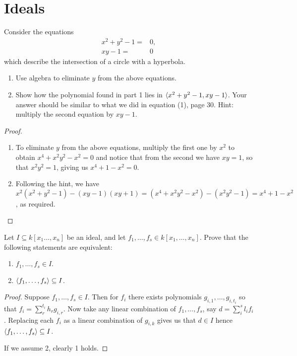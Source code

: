 \section{Ideals}


\begin{exercise}{1}
Consider the equations
\begin{align*}
    x^2+y^2-1 =& 0,\\
    xy-1 =& 0
\end{align*}
which describe the intersection of a circle with a hyperbola.
\begin{enumerate}
    \item Use algebra to eliminate $y$ from the above equations.
    \item Show how the polynomial found in part 1 lies in $\langle x^2+y^2-1, xy-1\rangle$. 
    Your answer should be similar to what we did in equation (1), page 30. 
    Hint: multiply the second equation by $xy-1$.
\end{enumerate}
\end{exercise}
\begin{proof}
\begin{enumerate}
    \item To eliminate $y$ from the above equations, multiply the first one by $x^2$ to obtain $x^4+x^2y^2-x^2=0$ and notice that from the second we have $xy=1$, so that $x^2y^2=1$, giving us $x^4+1-x^2=0$.
    \item Following the hint, we have 
    $x^2(x^2+y^2-1)-(xy-1)(xy+1) 
    =(x^4+x^2y^2-x^2)-(x^2y^2-1) 
    =x^4+1-x^2$, as required.
\end{enumerate}
\end{proof}

\begin{exercise}{2}
Let $I\subseteq k[x_1\dots,x_n]$ be an ideal, and let $f_1,\dots,f_s\in k[x_1,\dots,x_n]$. 
Prove that the following statements are equivalent:
\begin{enumerate}
    \item $f_1,\dots,f_s\in I$.
    \item $\langle f_1,\dots,f_s\rangle\subseteq I$.
\end{enumerate}
\end{exercise}
\begin{proof}
Suppose $f_1,\dots,f_s\in I$. 
Then for $f_i$ there exists polynomials $g_{i,1},\dots,g_{i,t_i}$ so that $f_i = \sum_r^{t_i} h_r g_{i,r}$. 
Now take any linear combination of $f_1,\dots,f_s$, say $d=\sum_i^s l_i f_i$. 
Replacing each $f_i$ as a linear combination of $g_{i,k}$ gives us that $d\in I$ hence $\langle f_1,\dots,f_s\rangle\subseteq I$. 

If we assume 2, clearly 1 holds.
\end{proof}

